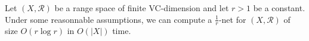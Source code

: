 \begin{lemma}[%
	name={Matou{\v s}ek~\cite[Corollary~4.5]{M95}}%
]
Let \((X, \mathcal{R})\) be a range space of finite VC-dimension and
let \(r > 1\) be a constant.
Under some reasonnable assumptions,
we can compute a \(\frac 1r\)-net for \((X, \mathcal{R})\)
of size \(O(r \log r)\) in \(O(| X |)\) time.
\end{lemma}
